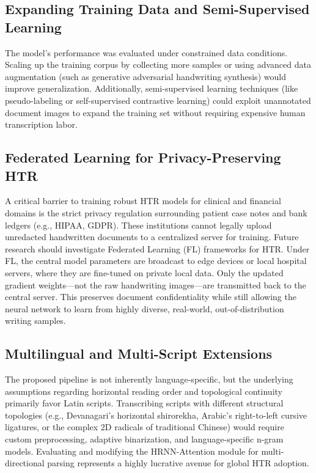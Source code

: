 \subsection{Expanding Training Data and Semi-Supervised Learning}
The model's performance was evaluated under constrained data conditions. Scaling up the training corpus by collecting more samples or using advanced data augmentation (such as generative adversarial handwriting synthesis) would improve generalization. Additionally, semi-supervised learning techniques (like pseudo-labeling or self-supervised contrastive learning) could exploit unannotated document images to expand the training set without requiring expensive human transcription labor.

\subsection{Federated Learning for Privacy-Preserving HTR}
A critical barrier to training robust HTR models for clinical and financial domains is the strict privacy regulation surrounding patient case notes and bank ledgers (e.g., HIPAA, GDPR). These institutions cannot legally upload unredacted handwritten documents to a centralized server for training. Future research should investigate Federated Learning (FL) frameworks for HTR. Under FL, the central model parameters are broadcast to edge devices or local hospital servers, where they are fine-tuned on private local data. Only the updated gradient weights—not the raw handwriting images—are transmitted back to the central server. This preserves document confidentiality while still allowing the neural network to learn from highly diverse, real-world, out-of-distribution writing samples.

\subsection{Multilingual and Multi-Script Extensions}
The proposed pipeline is not inherently language-specific, but the underlying assumptions regarding horizontal reading order and topological continuity primarily favor Latin scripts. Transcribing scripts with different structural topologies (e.g., Devanagari's horizontal shirorekha, Arabic's right-to-left cursive ligatures, or the complex 2D radicals of traditional Chinese) would require custom preprocessing, adaptive binarization, and language-specific n-gram models. Evaluating and modifying the HRNN-Attention module for multi-directional parsing represents a highly lucrative avenue for global HTR adoption.

